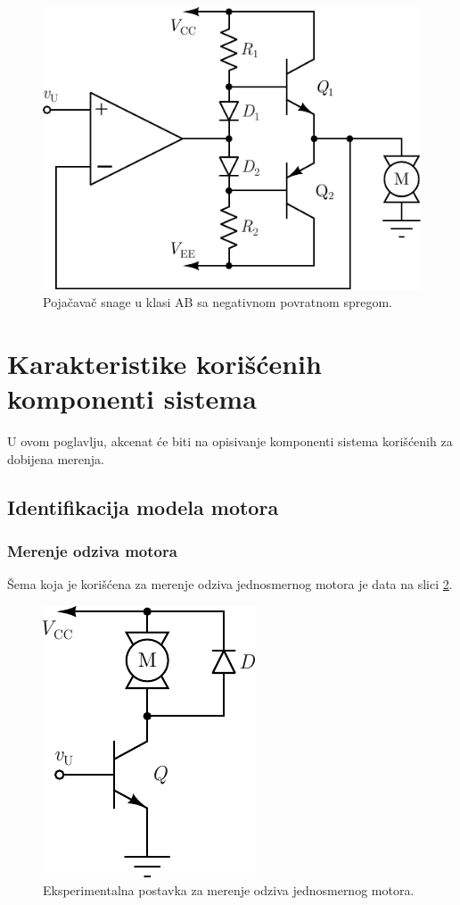 \documentclass[a4paper, 12pt, diplomski]{etf}
\begin{document}
\begin{figure}[h!]
    \centering
    \includegraphics[scale=1]{fig/PAABnps.pdf}
    \caption{Pojačavač snage u klasi AB sa negativnom povratnom spregom.}
    \label{PAABnps}
\end{figure}

\break

\section{Karakteristike korišćenih komponenti sistema}

U ovom poglavlju, akcenat će biti na opisivanje komponenti sistema korišćenih za dobijena merenja.

\subsection{Identifikacija modela motora}

\subsubsection{Merenje odziva motora}

Šema koja je korišćena za merenje odziva jednosmernog motora je data na slici \ref{DCsema1}.

\begin{figure}[h!]
    \centering
    \includegraphics[scale=1]{fig/DCtransistor.pdf}
    \caption{Eksperimentalna postavka za merenje odziva jednosmernog motora.}
    \label{DCsema1}
\end{figure}
\end{document}
